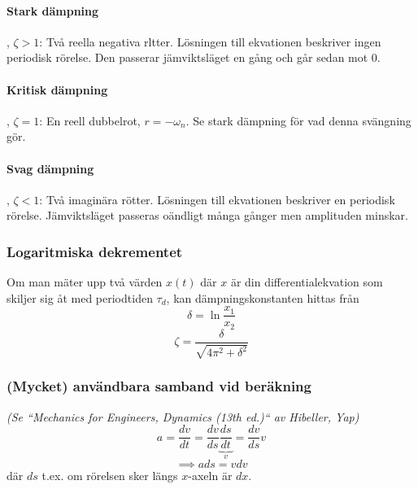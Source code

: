 \documentclass{article}
\newenvironment{ankiflashcard}[1]{}{}
\begin{document}
\begin{paracol}{2}
\begin{ankiflashcard}{Definiera de olika typerna av dämpning. Ange hur de beter sig samt vad för typ av rötter de är kopplade till.}
\paragraph{\color{red}Stark\color{black}  \quad dämpning}, $\zeta > 1$:
Två reella negativa rltter.
Lösningen till ekvationen beskriver ingen periodisk rörelse. 
Den passerar jämviktsläget en gång och går sedan mot 0.


\paragraph{\color{orange}Kritisk\color{black} 
 \quad dämpning}, $\zeta = 1$:
En reell dubbelrot, $r=-\omega_n$.
Se stark dämpning för vad denna svängning gör.


\paragraph{\color{green}Svag\color{black} 
 \quad dämpning}, $\zeta < 1$:
Två imaginära rötter.
Lösningen till ekvationen beskriver en periodisk rörelse. Jämviktsläget passeras oändligt många gånger men amplituden minskar.
\end{ankiflashcard}


\begin{ankiflashcard}{Definiera det logaritmiska dekrementet.}

\subsubsection{Logaritmiska dekrementet}
    
Om man mäter upp två värden $x(t)$ där $x$ är din differentialekvation som skiljer sig åt med periodtiden $\tau_d$, kan dämpningskonstanten hittas från
$$\delta = \ln \frac{x_1}{x_2}$$
$$\zeta = \frac{\delta}{\sqrt{4\pi^2 + \delta^2}}$$
\end{ankiflashcard}

\switchcolumn

\begin{ankiflashcard}{Formulera en integral för att bestämma ett uttryck för hastighet utifrån acceleration.}
\subsubsection{(Mycket) användbara samband vid beräkning}
\textit{(Se ``Mechanics for Engineers, Dynamics (13th ed.)`` av Hibeller, Yap)}
$$
a=\frac{dv}{dt}=\frac{dv}{ds}\underbrace{\frac{ds}{dt}}_{v} = \frac{dv}{ds}v
$$
$$
\implies \boxed{a ds = v dv}
$$
där $ds$ t.ex. om rörelsen sker längs $x$-axeln är $dx$.
\end{ankiflashcard}
    

\end{paracol}
\end{document}
